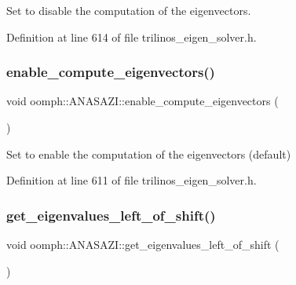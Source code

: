 Set to disable the computation of the eigenvectors. 



Definition at line 614 of file trilinos\+\_\+eigen\+\_\+solver.\+h.

\mbox{\label{classoomph_1_1ANASAZI_aa965449f7db8c881305665ba83d4b9b6}} 
\subsubsection{\texorpdfstring{enable\+\_\+compute\+\_\+eigenvectors()}{enable\_compute\_eigenvectors()}}
{\footnotesize\ttfamily void oomph\+::\+A\+N\+A\+S\+A\+Z\+I\+::enable\+\_\+compute\+\_\+eigenvectors (\begin{DoxyParamCaption}{ }\end{DoxyParamCaption})\hspace{0.3cm}{\ttfamily [inline]}}



Set to enable the computation of the eigenvectors (default) 



Definition at line 611 of file trilinos\+\_\+eigen\+\_\+solver.\+h.

\mbox{\label{classoomph_1_1ANASAZI_a914ad9d78433c746b46f22bc429db8e9}} 
\subsubsection{\texorpdfstring{get\+\_\+eigenvalues\+\_\+left\+\_\+of\+\_\+shift()}{get\_eigenvalues\_left\_of\_shift()}}
{\footnotesize\ttfamily void oomph\+::\+A\+N\+A\+S\+A\+Z\+I\+::get\+\_\+eigenvalues\+\_\+left\+\_\+of\+\_\+shift (\begin{DoxyParamCaption}{ }\end{DoxyParamCaption})\hspace{0.3cm}{\ttfamily [inline]}}



